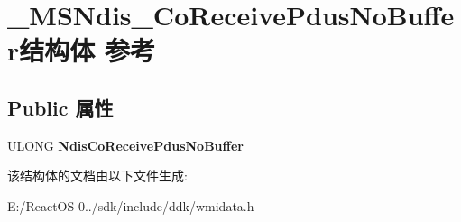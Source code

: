 \hypertarget{struct___m_s_ndis___co_receive_pdus_no_buffer}{}\section{\+\_\+\+M\+S\+Ndis\+\_\+\+Co\+Receive\+Pdus\+No\+Buffer结构体 参考}
\label{struct___m_s_ndis___co_receive_pdus_no_buffer}
\subsection*{Public 属性}
\begin{DoxyCompactItemize}
\item 
\mbox{\label{struct___m_s_ndis___co_receive_pdus_no_buffer_a519587b914ac19d42506208618c2ff80}} 
U\+L\+O\+NG {\bfseries Ndis\+Co\+Receive\+Pdus\+No\+Buffer}
\end{DoxyCompactItemize}


该结构体的文档由以下文件生成\+:\begin{DoxyCompactItemize}
\item 
E\+:/\+React\+O\+S-\/0../sdk/include/ddk/wmidata.\+h\end{DoxyCompactItemize}
